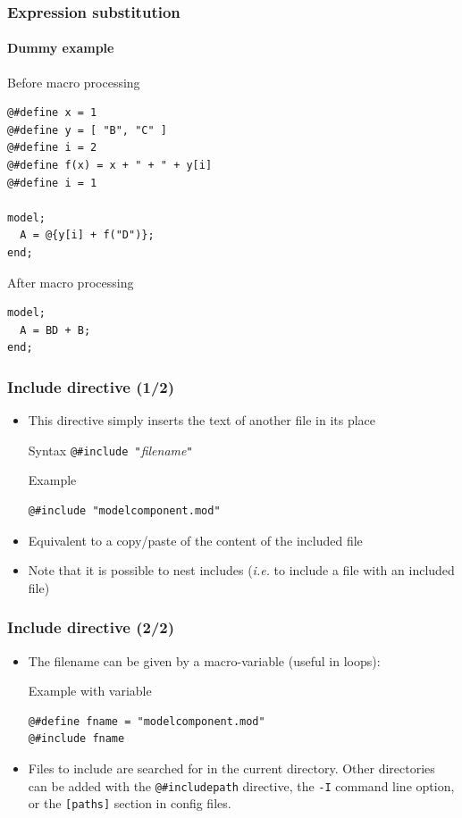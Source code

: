 \documentclass[aspectratio=169]{beamer}
\begin{document}
\begin{frame}[fragile=singleslide]
  \frametitle{Expression substitution}
  \framesubtitle{Dummy example}
  \begin{block}{Before macro processing}
\begin{verbatim}
@#define x = 1
@#define y = [ "B", "C" ]
@#define i = 2
@#define f(x) = x + " + " + y[i]
@#define i = 1

model;
  A = @{y[i] + f("D")};
end;
\end{verbatim}
  \end{block}
  \begin{block}{After macro processing}
\begin{verbatim}
model;
  A = BD + B;
end;
\end{verbatim}
  \end{block}
\end{frame}

\begin{frame}[fragile=singleslide]
  \frametitle{Include directive (1/2)}
  \begin{itemize}
  \item This directive simply inserts the text of another file in its place
    \begin{block}{Syntax}
      \verb+@#include "+\textit{filename}\verb+"+
    \end{block}
    \begin{block}{Example}
\begin{verbatim}
@#include "modelcomponent.mod"
\end{verbatim}
    \end{block}
  \item Equivalent to a copy/paste of the content of the included file
  \item Note that it is possible to nest includes (\textit{i.e.} to include a
    file with an included file)
  \end{itemize}
\end{frame}

\begin{frame}[fragile=singleslide]
  \frametitle{Include directive (2/2)}
  \begin{itemize}
\item The filename can be given by a macro-variable (useful in loops):
    \begin{block}{Example with variable}
\begin{verbatim}
@#define fname = "modelcomponent.mod"
@#include fname
\end{verbatim}
    \end{block}
  \item Files to include are searched for in the current directory. Other directories can
    be added with the
    \verb+@#includepath+ directive, the \texttt{-I} command line option, or the
    \texttt{[paths]} section in config files.
  \end{itemize}
\end{frame}
\end{document}
